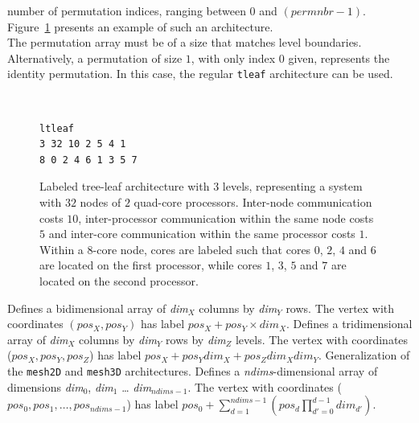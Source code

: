 \begin{itemize}
number of permutation indices, ranging between $0$ and
$(\mathit{permnbr}-1)$. Figure~\ref{fig-file-targetltleaf} presents an
example of such an architecture.
\\
The permutation array must be of a size that matches level
boundaries. Alternatively, a permutation of size $1$, with only index
$0$ given, represents the identity permutation. In this case, the
regular \texttt{tleaf} architecture can be used.
\begin{figure}[hbt]
\begin{center}
\begin{minipage}[b]{6cm}
{\renewcommand{\baselinestretch}{1.05}
\footnotesize\tt
\begin{verbatim}
ltleaf
3 32 10 2 5 4 1
8 0 2 4 6 1 3 5 7
\end{verbatim}
}\end{minipage}
\end{center}
\caption{Labeled tree-leaf architecture with $3$ levels, representing
a system with $32$ nodes of $2$ quad-core processors. Inter-node
communication costs $10$, inter-processor communication within the
same node costs $5$ and inter-core communication within the same
processor costs $1$. Within a $8$-core node, cores are labeled such
that cores $0$, $2$, $4$ and $6$ are located on the first processor,
while cores $1$, $3$, $5$ and $7$ are located on the second processor.}
\label{fig-file-targetltleaf}
\end{figure}
Defines a bidimensional array of {\it dim$_X$} columns by {\it dim$_Y$}
rows. The vertex with coordinates $(\mathit{pos_X},\mathit{pos_Y})$
has label $\mathit{pos_X} + \mathit{pos_Y} \times \mathit{dim_X}$.
Defines a tridimensional array of {\it dim$_X$} columns by {\it dim$_Y$}
rows by {\it dim$_Z$} levels. The vertex with coordinates
($\mathit{pos_X},\mathit{pos_Y},\mathit{pos_Z}$) has label
$\mathit{pos_X} + \mathit{pos_Y} \mathit{dim_X} + \mathit{pos_Z} \mathit{dim_X} \mathit{dim_Y}$.
Generalization of the \texttt{mesh2D} and \texttt{mesh3D}
architectures. Defines a \textit{ndims}-dimensional array of
dimensions \textit{dim$_0$}, \textit{dim$_1$} \ldots
\textit{dim$_{ndims - 1}$}. The vertex with coordinates 
($\mathit{pos_0},\mathit{pos_1},\ldots,\mathit{pos_{ndims - 1}}$)
has label $\mathit{pos_0} + \sum_{d=1}^{ndims - 1}\left(\mathit{pos_d} \prod_{d'=0}^{d-1}\mathit{dim_{d'}}\right)$.

\end{itemize}
